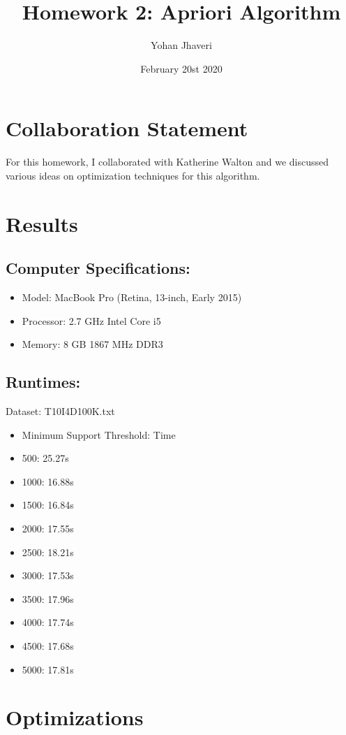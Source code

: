 \documentclass{article}
\title{Homework 2: Apriori Algorithm}
\author{Yohan Jhaveri}
\date{February 20st 2020}
\begin{document}
\maketitle

\section{Collaboration Statement}
For this homework, I collaborated with Katherine Walton and we discussed various ideas on optimization techniques for this algorithm.

\section{Results}
\subsection{Computer Specifications:}
\begin{itemize}
\item Model: MacBook Pro (Retina, 13-inch, Early 2015)
\item Processor: 2.7 GHz Intel Core i5
\item Memory: 8 GB 1867 MHz DDR3
\end{itemize}

\subsection{Runtimes:}
Dataset: T10I4D100K.txt

\begin{itemize}
\item Minimum Support Threshold: Time
\item 500: 25.27s
\item 1000: 16.88s
\item 1500: 16.84s
\item 2000: 17.55s
\item 2500: 18.21s
\item 3000: 17.53s
\item 3500: 17.96s
\item 4000: 17.74s
\item 4500: 17.68s
\item 5000: 17.81s
\end{itemize}



\section{Optimizations}
\end{document}
